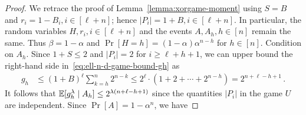     \begin{proof}
        We retrace the proof of Lemma~\ref{lemma:xorgame-moment} 
        using $S = B$ and $r_i = 1 - B_i, i \in [\ell + n]$; 
        hence $|P_i| = 1 + B, i \in [\ell + n]$. 
        In particular, the random variables $H, r_i, i \in [\ell + n]$ 
        and the 
        events $A, A_h, h \in [n]$ remain the same. 
        Thus $\beta = 1 - \alpha$ and 
        $\Pr[H = h] = (1 - \alpha) \alpha^{n - h}$ for $h \in [n]$. 
        Condition on $A_h$. 
        Since $1 + S \leq 2$ and $|P_i| = 2$ for $i \geq \ell + h + 1$, 
        we can upper bound the right-hand side in~\eqref{eq:ell-n-d-game-bound-gh} as 
        \begin{align*}
            g_h
            &\leq (1 + B)^\ell \sum_{k = h}^n 2^{n - k}
            \leq 
                2^{\ell} \cdot ( 1 + 2 + \cdots + 2^{n - h} ) 
            = 2^{n + \ell - h + 1}
        \,.
        \end{align*}
        It follows that
        $
            \operatorname{\mathbb{E}} [g_h^\lambda \mid A_h]
            \leq 
                2^{\lambda(n + \ell - h + 1)} 
        $ 
        since 
        the quantities $|P_{i}|$ in the game $U$ are independent. 
        Since $\Pr[A] = 1 - \alpha^n$, we have 

\end{proof}
